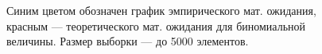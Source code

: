 \documentclass[12pt, a4paper]{article}
\begin{document}
\begin{figure}[H]
\caption{Синим цветом обозначен график эмпирического мат. ожидания, красным --- теоретического мат. ожидания для биномиальной величины. Размер выборки --- до 5000 элементов.}
\end{figure}
\end{document}
